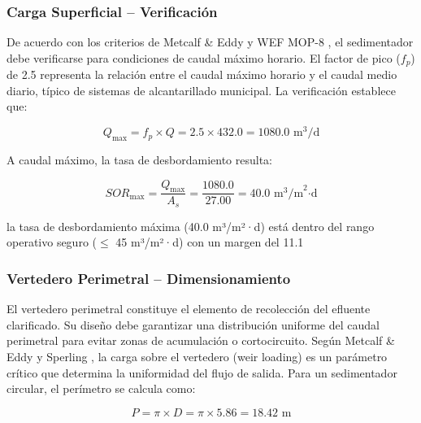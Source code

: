 \documentclass[12pt,a4paper]{article}
\begin{document}
\subsubsection{Carga Superficial -- Verificación}

De acuerdo con los criterios de Metcalf \& Eddy \cite{metcalf2014} y WEF MOP-8 \cite{wef_mop8_2010}, el sedimentador debe verificarse para condiciones de caudal máximo horario. El factor de pico ($f_p$) de 2.5 representa la relación entre el caudal máximo horario y el caudal medio diario, típico de sistemas de alcantarillado municipal. La verificación establece que:

\begin{equation}
Q_{\max} = f_p \times Q = 2.5 \times 432.0 = 1080.0 \text{ m}^3\text{/d}
\end{equation}

A caudal máximo, la tasa de desbordamiento resulta:

\begin{equation}
SOR_{\max} = \frac{Q_{\max}}{A_s} = \frac{1080.0}{27.00} = 40.0 \text{ m}^3\text{/m}^2\text{·d}
\end{equation}

la tasa de desbordamiento máxima (40.0 m³/m²·d) está dentro del rango operativo seguro ($\leq$ 45 m³/m²·d) con un margen del 11.1%

\subsubsection{Vertedero Perimetral -- Dimensionamiento}

El vertedero perimetral constituye el elemento de recolección del efluente clarificado. Su diseño debe garantizar una distribución uniforme del caudal perimetral para evitar zonas de acumulación o cortocircuito. Según Metcalf \& Eddy \cite{metcalf2014} y Sperling \cite{sperling2007}, la carga sobre el vertedero (weir loading) es un parámetro crítico que determina la uniformidad del flujo de salida. Para un sedimentador circular, el perímetro se calcula como:

\begin{equation}
P = \pi \times D = \pi \times 5.86 = 18.42 \text{ m}
\end{equation}
\end{document}
